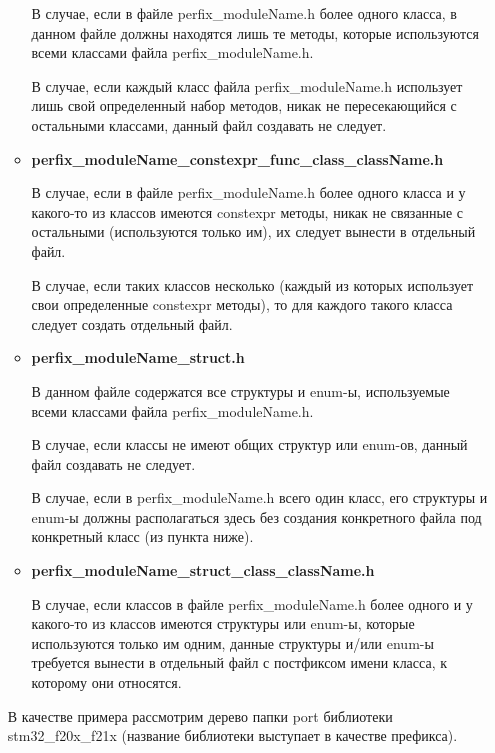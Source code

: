 \begin{enumerate}
\begin{itemize}
		В случае, если в файле perfix\_moduleName.h более одного класса, в данном файле должны находятся лишь те методы, которые используются всеми классами файла perfix\_moduleName.h.
		
		В случае, если каждый класс файла perfix\_moduleName.h использует лишь свой определенный набор методов, никак не пересекающийся с остальными классами, данный файл создавать не следует.
		\item \textbf{perfix\_moduleName\_constexpr\_func\_class\_className.h}
		
		В случае, если в файле perfix\_moduleName.h более одного класса и у какого-то из классов имеются constexpr методы, никак не связанные с остальными (используются только им), их следует вынести в отдельный файл. 
		
		В случае, если таких классов несколько (каждый из которых использует свои определенные constexpr методы), то для каждого такого класса следует создать отдельный файл.
		\item \textbf{perfix\_moduleName\_struct.h}
		
		В данном файле содержатся все структуры и enum-ы, используемые всеми классами файла perfix\_moduleName.h.
		
		В случае, если классы не имеют общих структур или enum-ов, данный файл создавать не следует.
		
		В случае, если в perfix\_moduleName.h всего один класс, его структуры и enum-ы должны располагаться здесь без создания конкретного файла под конкретный класс (из пункта ниже).
		\item \textbf{perfix\_moduleName\_struct\_class\_className.h}
		
		В случае, если классов в файле perfix\_moduleName.h более одного и у какого-то из классов имеются структуры или enum-ы, которые используются только им одним, данные структуры и/или enum-ы требуется вынести в отдельный файл с постфиксом имени класса, к которому они относятся.
	\end{itemize}
	В качестве примера рассмотрим дерево папки port библиотеки stm32\_f20x\_f21x (название библиотеки выступает в качестве префикса).
	

\end{enumerate}
